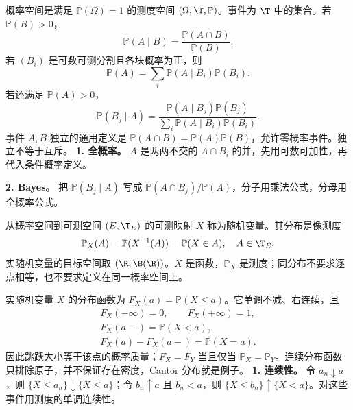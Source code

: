 概率空间是满足 $\mathbb P(\Omega)=1$ 的测度空间 $(\Omega,\T,\mathbb P)$。事件为 $\T$ 中的集合。若 $\mathbb P(B)>0$，
\[
\mathbb P(A\mid B)=\frac{\mathbb P(A\cap B)}{\mathbb P(B)}.
\]
若 $(B_i)$ 是可数可测分割且各块概率为正，则
\[
\mathbb P(A)=\sum_i\mathbb P(A\mid B_i)\mathbb P(B_i).
\]
若还满足 $\mathbb P(A)>0$，
\[
\mathbb P(B_j\mid A)
=\frac{\mathbb P(A\mid B_j)\mathbb P(B_j)}
{\sum_i\mathbb P(A\mid B_i)\mathbb P(B_i)}.
\]
事件 $A,B$ 独立的通用定义是 $\mathbb P(A\cap B)=\mathbb P(A)\mathbb P(B)$，允许零概率事件。独立不等于互斥。
\textbf{1. 全概率。} $A$ 是两两不交的 $A\cap B_i$ 的并，先用可数可加性，再代入条件概率定义。

\textbf{2. Bayes。} 把 $\mathbb P(B_j\mid A)$ 写成 $\mathbb P(A\cap B_j)/\mathbb P(A)$，分子用乘法公式，分母用全概率公式。

从概率空间到可测空间 $(E,\T_E)$ 的可测映射 $X$ 称为随机变量。其分布是像测度
\[
\mathbb P_X(A)=\mathbb P(X^{-1}(A))
=\mathbb P(X\in A),\quad A\in\T_E.
\]
实随机变量的目标空间取 $(\R,\B(\R))$。$X$ 是函数，$\mathbb P_X$ 是测度；同分布不要求逐点相等，也不要求定义在同一概率空间上。


实随机变量 $X$ 的分布函数为 $F_X(a)=\mathbb P(X\le a)$。它单调不减、右连续，且
\[
\begin{gathered}
F_X(-\infty)=0,\qquad F_X(+\infty)=1,\\
F_X(a-)=\mathbb P(X<a),\\
F_X(a)-F_X(a-)=\mathbb P(X=a).
\end{gathered}
\]
因此跳跃大小等于该点的概率质量；$F_X=F_Y$ 当且仅当 $\mathbb P_X=\mathbb P_Y$。连续分布函数只排除原子，并不保证存在密度，Cantor 分布就是例子。
\textbf{1. 连续性。} 令 $a_n\downarrow a$，则 $\{X\le a_n\}\downarrow\{X\le a\}$；令 $b_n\uparrow a$ 且 $b_n<a$，则 $\{X\le b_n\}\uparrow\{X<a\}$。对这些事件用测度的单调连续性。

